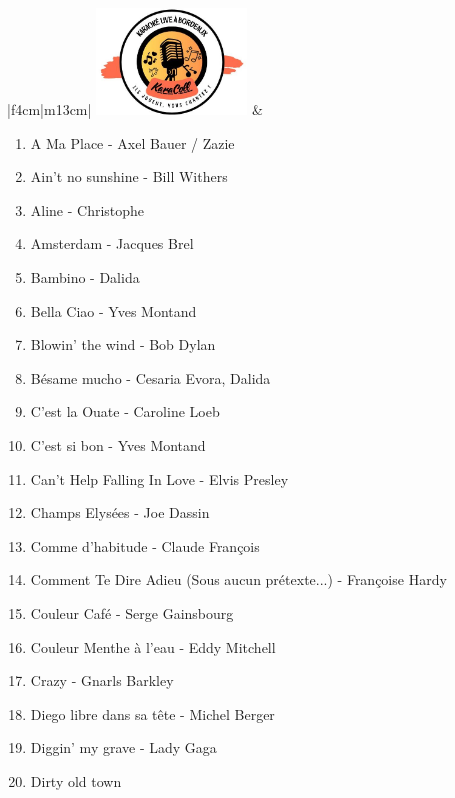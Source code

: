 \documentclass[12pt]{extarticle}
\begin{document}
    \begin{tblr}{|f{4cm}|m{13cm}|}
      \hline 
      \includegraphics[width=4cm]{cropped-logo-karacoll.jpeg} &
      \huge {} \\
      \hline
\end{tblr}
\vspace{1em}
\begin{multicols}{2}
\sloppy
\begin{enumerate}[nolistsep]
\item   A Ma Place
        - Axel Bauer / Zazie
\item   Ain't no sunshine
        - Bill Withers
\item   Aline
        - Christophe
\item   Amsterdam
        - Jacques Brel
\item   Bambino
        - Dalida
\item   Bella Ciao
        - Yves Montand
\item   Blowin' the wind
        - Bob Dylan
\item   Bésame mucho
        - Cesaria Evora, Dalida
\item   C'est la Ouate
        - Caroline Loeb
\item   C'est si bon
        - Yves Montand
\item   Can't Help Falling In Love
        - Elvis Presley
\item   Champs Elysées
        - Joe Dassin
\item   Comme d'habitude
        - Claude François
\item   Comment Te Dire Adieu (Sous aucun prétexte...)
        - Françoise Hardy
\item   Couleur Café
        - Serge Gainsbourg
\item   Couleur Menthe à l'eau
        - Eddy Mitchell
\item   Crazy
        - Gnarls Barkley
\item   Diego libre dans sa tête
        - Michel Berger
\item   Diggin' my grave
        - Lady Gaga
\item   Dirty old town

\end{enumerate}
\end{multicols}
\end{document}
